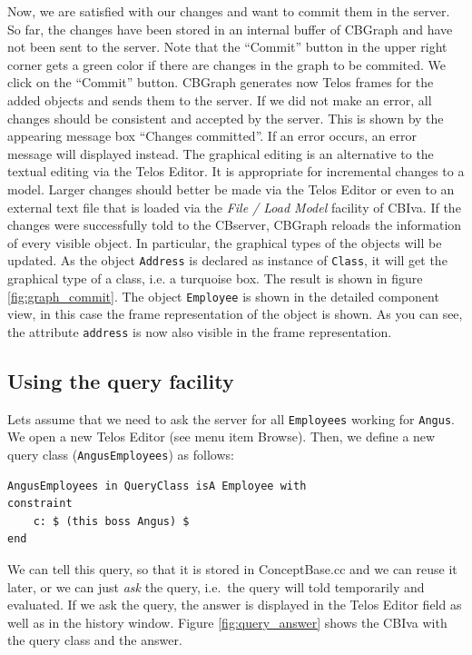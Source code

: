 Now, we are satisfied with our changes and want to commit them in the server. So far, the
changes have been stored in an internal buffer of CBGraph and have not been
sent to the server. Note that the ``Commit'' button in the upper right corner gets a green color if there are changes in the
graph to be commited. We click on the ``Commit'' button.
CBGraph generates now Telos frames for the added objects and sends them
to the server. If we did not make an error, all changes should be consistent
and accepted by the server. This is shown by the appearing message box ``Changes committed''.
If an error occurs, an error message will displayed instead. The graphical editing is
an alternative to the textual editing via the Telos Editor. It is appropriate for incremental
changes to a model. Larger changes should better be made via the Telos Editor or
even to an external text file that is loaded via the {\em File / Load Model\/} facility
of CBIva.
If the changes were successfully told to the CBserver, CBGraph
reloads the information of every visible object. In particular, the graphical
types of the objects will be updated. As the object {\tt Address} is declared
as instance of {\tt Class}, it will get the graphical type of a class, i.e.
a turquoise box. The result is shown in figure \ref{fig:graph_commit}. The object
{\tt Employee} is shown in the detailed component view, in this case the
frame representation of the object is shown. As you can see, the attribute
{\tt address} is now also visible in the frame representation.



\subsection{Using the query facility}


Lets assume that we need to ask the server for all {\tt Employees} working for {\tt Angus}. 
We open a new Telos Editor (see menu item Browse).
Then, we define a new query class ({\tt AngusEmployees}) as follows:

\begin{verbatim}
AngusEmployees in QueryClass isA Employee with
constraint
    c: $ (this boss Angus) $
end
\end{verbatim}

We can tell this query, so that it is stored in ConceptBase.cc and we can reuse it later,
or we can just {\em ask} the query, i.e.\ the query will told temporarily and evaluated.
If we ask the query, the answer is displayed in the Telos Editor field as well as in
the history window. Figure \ref{fig:query_answer} shows the
CBIva with the query class and the answer.

